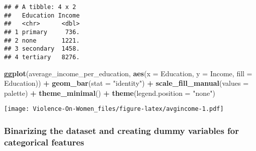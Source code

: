 \documentclass[
]{article}
\newenvironment{Shaded}{\begin{snugshade}}{\end{snugshade}}
\newcommand{\AttributeTok}[1]{\textcolor[rgb]{0.13,0.29,0.53}{#1}}
\newcommand{\FunctionTok}[1]{\textcolor[rgb]{0.13,0.29,0.53}{\textbf{#1}}}
\newcommand{\NormalTok}[1]{#1}
\newcommand{\SpecialCharTok}[1]{\textcolor[rgb]{0.81,0.36,0.00}{\textbf{#1}}}
\newcommand{\StringTok}[1]{\textcolor[rgb]{0.31,0.60,0.02}{#1}}
\begin{document}
\begin{verbatim}
## # A tibble: 4 x 2
##   Education Income
##   <chr>      <dbl>
## 1 primary     736.
## 2 none       1221.
## 3 secondary  1458.
## 4 tertiary   8276.
\end{verbatim}

\begin{Shaded}
\begin{Highlighting}[]
\FunctionTok{ggplot}\NormalTok{(average\_income\_per\_education, }\FunctionTok{aes}\NormalTok{(}\AttributeTok{x =}\NormalTok{ Education, }\AttributeTok{y =}\NormalTok{ Income, }\AttributeTok{fill =}\NormalTok{ Education)) }\SpecialCharTok{+}
  \FunctionTok{geom\_bar}\NormalTok{(}\AttributeTok{stat =} \StringTok{"identity"}\NormalTok{) }\SpecialCharTok{+}
  \FunctionTok{scale\_fill\_manual}\NormalTok{(}\AttributeTok{values =}\NormalTok{ palette) }\SpecialCharTok{+}
  \FunctionTok{theme\_minimal}\NormalTok{() }\SpecialCharTok{+}
  \FunctionTok{theme}\NormalTok{(}\AttributeTok{legend.position =} \StringTok{"none"}\NormalTok{)}
\end{Highlighting}
\end{Shaded}

\texttt{[image: Violence-On-Women\_files/figure-latex/avgincome-1.pdf]}

\hypertarget{binarizing-the-dataset-and-creating-dummy-variables-for-categorical-features}{%
\subsubsection{Binarizing the dataset and creating dummy variables for
categorical
features}\label{binarizing-the-dataset-and-creating-dummy-variables-for-categorical-features}}
\end{document}

